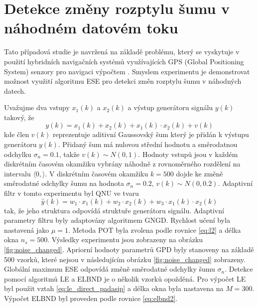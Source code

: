 \section{Detekce změny rozptylu šumu v náhodném datovém toku}\label{chap:mdpi_noise_change}
Tato případová studie je navržená na základě problému, který se vyskytuje v použití hybridních navigačních systémů využívajících GPS (Global Positioning System) senzory pro navigaci výpočtem \cite{dead}. Smyslem experimentu je demonstrovat možnost využití algoritmu ESE pro detekci změn rozptylu šumu v náhodných datech.
\par
Uvažujme dva vstupy $x_1(k)$ a $x_2(k)$ a výstup generátoru signálu $y(k)$ takový, že
\begin{equation}
y(k)=x_1(k)+x_2(k)+x_1(k)\cdot x_2(k)+v(k)
\end{equation}
kde člen $v(k)$ reprezentuje aditivní Gaussovský šum který je přidán k výstupu generátoru $y(k)$. Přidaný šum má nulovou střední hodnotu a směrodatnou odchylku $\sigma_n=0.1$, takže $v(k)\sim N(0,1)$. Hodnoty vstupů jsou v každém diskrétním časovém okamžiku vybrány náhodně z rovnoměrného rozdělení na intervalu $\langle 0,\rangle$. V diskrétním časovém okamžiku $k=500$ dojde ke změně směrodatné odchylky šumu na hodnota $\sigma_n=0.2$, $v(k) \sim N(0,0.2)$. Adaptivní filtr v tomto experimentu byl QNU ve tvaru
\begin{equation}
\hat{y}(k)=w_1\cdot x_1(k) + w_2\cdot x_2(k)+w_3\cdot x_1(k)\cdot x_2(k)
\end{equation}
tak,  že jeho struktura odpovídá struktuře generátoru signálu. Adaptivní parametry filtru byly adaptovány algoritmem GNGD. Rychlost učení byla nastavená jako $\mu=1$. Metoda POT byla zvolena podle rovnice \ref{eq:l2} a délka okna $n_s=500$. Výsledky experimentu jsou zobrazeny na obrázku \ref{fig:noise_changed}. Apriorní hodnoty parametrů GPD byly stanoveny na základě 500 vzorků, které nejsou v následujícím obrázku \ref{fig:noise_changed} zobrazeny. Globální maximum ESE odpovídá změně směrodatné odchylky šumu $\sigma_n$. Detekce pomocí algoritmů LE a ELBND je o několik vzorků opožděná. Pro výpočet LE byl použit vztah \ref{eq:le_direct_padasip} a délka okna byla nastavena na $M=300$. Výpočet ELBND byl proveden podle rovnice \ref{eq:elbnd2}.

